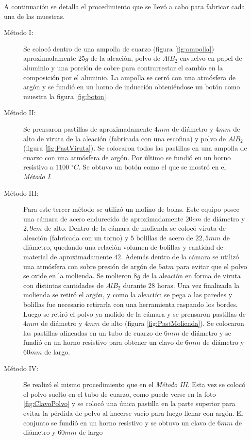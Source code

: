 \documentclass[a4paper,12pt,fleqn,twoside,openany]{book}
\begin{document}
A continuación se detalla el procedimiento que se llevó a cabo para fabricar cada una de las muestras.


\begin{description}
\item[Método I:] Se colocó dentro de una ampolla de cuarzo (figura \ref{fig:ampolla}) aproximadamente $25 g$ de la aleación, polvo de $AlB_2$ envuelvo en papel de aluminio y una porción de 
cobre para contrarrestar el cambio en la composición por el aluminio. La ampolla se cerró con una atmósfera de argón y se fundió en un horno de inducción obteniéndose un botón como muestra la figura \ref{fig:boton}.

\item[Método II:] Se prensaron pastillas de aproximadamente $4 mm$ de diámetro y $4 mm$ de alto de viruta de la aleación (fabricada con una escofina) y polvo de $AlB_2$ (figura \ref{fig:PastViruta}). Se 
colocaron todas las pastillas en una ampolla de cuarzo con una atmósfera de argón. Por último se fundió en un horno resistivo a $1100$ $^\circ C$. Se obtuvo un botón como el que se mostró en el \textsl{Método I}.

\item[Método III:] Para este tercer método se utilizó un molino de bolas. Este equipo posee una cámara de acero endurecido de aproximadamente $20 cm$ de diámetro y $2,9 cm$ de alto. Dentro de la cámara de molienda se colocó viruta de aleación (fabricada con un torno) y $5$ bolillas de acero de $22,5 mm$ de diámetro, quedando una relación volumen de bolillas y cantidad de material de aproximadamente $42$. Además dentro de la cámara se utilizó una atmósfera con sobre presión de argón de $5 atm$ para evitar que el polvo se oxide en la molienda.
Se molieron $8g$ de la aleación en forma de viruta con distintas cantidades de $AlB_2$ durante $28$ horas.  Una vez finalizada la molienda se retiró el argón, y 
como la aleación se pega a las paredes y bolillas fue necesario retirarla con una herramienta raspando los bordes.
Luego se retiró el polvo ya molido de la cámara y se prensaron pastillas de $4mm$ de diámetro y $4mm$ de alto (figura \ref{fig:PastMolienda}). Se colocaron las pastillas alineadas en un tubo de cuarzo de $6 mm$ de diámetro y se fundió en un horno resistivo para obtener un clavo de $6 mm$ de diámetro y $60 mm$ de largo.

\item[Método IV:] Se realizó el mismo procedimiento que en el \textsl{Método III}. Esta vez se colocó el polvo suelto en el tubo de cuarzo, como puede verse en la foto \ref{fig:ClavoPolvo} y se colocó una única pastilla en la parte superior para evitar la pérdida de polvo al hacerse vacío para luego llenar con argón. El conjunto se fundió en un horno resistivo y se obtuvo un clavo de $6 mm$ de diámetro y $60 mm$ de largo 
\end{description}
\end{document}
